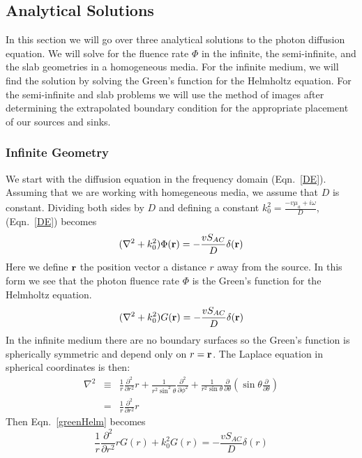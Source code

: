 \subsection{Analytical Solutions}
In this section we will go over three analytical solutions to the photon diffusion equation. We will solve for the fluence rate $\Phi$ in the infinite, the semi-infinite, and the slab geometries in a homogeneous media. For the infinite medium, we will find the solution by solving the Green's function for the Helmholtz equation. For the semi-infinite and slab problems we will use the method of images after determining the extrapolated boundary condition for the appropriate placement of our sources and sinks.

\subsubsection{Infinite Geometry}
We start with the diffusion equation in the frequency domain (Eqn.~\ref{DE}). Assuming that we are working with homegeneous media, we assume that $D$ is constant. Dividing both sides by $D$ and defining a constant $k_0^2 = \frac{- v\mu_a + i\omega}{D}$, (Eqn.~\ref{DE}) becomes
\begin{equation}
\label{DEHelm}
(\nabla^2+k_0^2)\Phi({\bf r})=-\frac{vS_{AC}}{D}\delta({\bf r})
\end{equation}
\noindent
Here we define ${\bf r}$ the position vector a distance $r$ away from the source. In this form we see that the photon fluence rate $\Phi$ is the Green's function for the Helmholtz equation.
\begin{equation}
\label{greenHelm}
(\nabla^2+k_0^2)G({\bf r})=-\frac{vS_{AC}}{D}\delta({\bf r})
\end{equation}
\noindent
In the infinite medium there are no boundary surfaces so the Green's function is spherically symmetric and depend only on $r={\bf r}$. The Laplace equation in spherical coordinates is then:
\begin{eqnarray}
\label{laplacian}
\nabla^2 & \equiv & \frac{1}{r}\frac{\partial^2}{\partial r^2}r 
+ \frac{1}{r^2\sin^2\theta}\frac{\partial^2}{\partial\phi^2}
+ \frac{1}{r^2\sin\theta}\frac{\partial}
{\partial\theta}\left(\sin\theta\frac{\partial}{\partial\theta}\right)
\nonumber \\
& = & \frac{1}{r}\frac{\partial^2}{\partial r^2}r
\end{eqnarray}
Then Eqn.~\ref{greenHelm} becomes
\begin{equation}
\label{greenHelmLaplace}
\frac{1}{r}\frac{\partial^2}{\partial r^2}rG(r) + k_0^2G(r) 
=-\frac{vS_{AC}}{D}\delta(r)
\end{equation}
